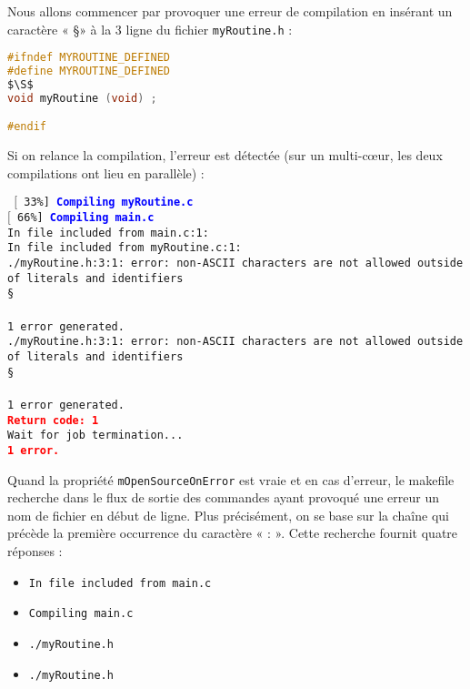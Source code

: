 \documentclass[a4paper,11pt]{extarticle}
\begin{document}
Nous allons commencer par provoquer une erreur de compilation en insérant un caractère « \S » à la 3 ligne du fichier \texttt{myRoutine.h} :
\begin{lstlisting}[mathescape,language=C]
#ifndef MYROUTINE_DEFINED
#define MYROUTINE_DEFINED
$\S$
void myRoutine (void) ;

#endif
\end{lstlisting}

Si on relance la compilation, l'erreur est détectée (sur un multi-cœur, les deux compilations ont lieu en parallèle) :

\begin{mdframed}[hidealllines=true,backgroundcolor=lightgray!20]
\noindent\texttt{\footnotesize
$[$~33\%]~\textcolor{blue}{\bf Compiling myRoutine.c}\\
$[$~66\%]~\textcolor{blue}{\bf Compiling main.c}\\
In file included from main.c:1:\\
In file included from myRoutine.c:1:\\
./myRoutine.h:3:1: error: non-ASCII characters are not allowed outside of literals and identifiers\\
\S\\
\^\\
1 error generated.\\
./myRoutine.h:3:1: error: non-ASCII characters are not allowed outside of literals and identifiers\\
\S\\
\^\\
1 error generated.\\
\textcolor{red}{\bf Return code: 1}\\
Wait for job termination...\\
\textcolor{red}{\bf 1 error.}
}
\end{mdframed}

Quand la propriété \texttt{mOpenSourceOnError} est vraie et en cas d'erreur, le makefile recherche dans le flux de sortie des commandes ayant provoqué une erreur un nom de fichier en début de ligne. Plus précisément, on se base sur la chaîne qui précède la première occurrence du caractère « : ». Cette recherche fournit quatre réponses :
\begin{itemize}
\item \colorbox{lightgray!20}{\tt In file included from main.c}
\item \colorbox{lightgray!20}{\tt Compiling main.c}
\item \colorbox{lightgray!20}{\tt ./myRoutine.h}
\item \colorbox{lightgray!20}{\tt ./myRoutine.h}
\end{itemize}
\end{document}
